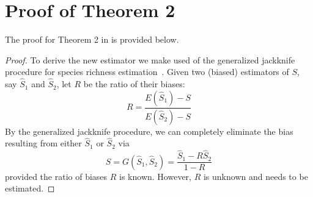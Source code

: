 \documentclass[conference]{IEEEtran}
\begin{document}
\section{Proof of Theorem 2}
\label{sec:prth2}
The proof for Theorem 2 in  is provided below.
\begin{proof}
To derive the new estimator we make used of the generalized jackknife procedure for species richness estimation~\cite{heltshe1983estimating}. Given two (biased) estimators of $S$, say $\hat{S}_1$ and $\hat{S}_2$, let $R$ be the ratio of their biases:
\begin{equation}
R = \frac{E(\hat{S}_1) - S}{E(\hat{S}_2) - S}
\end{equation}
By the generalized jackknife procedure, we can completely eliminate the bias resulting from either $\hat{S}_1$ or $\hat{S}_2$ via
\begin{equation}
S = G(\hat{S}_1, \hat{S}_2) = \frac{\hat{S}_1 - R\hat{S}_2}{1 - R}
\label{eq:jknife}
\end{equation}
provided the ratio of biases $R$ is known. However, $R$ is unknown and needs to be estimated. 


\end{proof}
\end{document}
